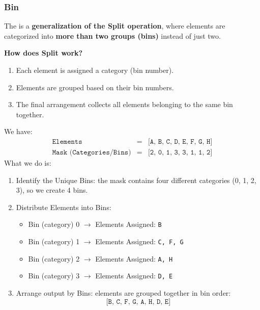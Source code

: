 \subsubsection{Bin}\label{subsubsection: Bin}

The  is a \textbf{generalization of the Split operation}, where elements are categorized into \textbf{more than two groups (bins)} instead of just two.

\highspace
\begin{flushleft}
    \textcolor{Green3}{ \textbf{How does Split work?}}
\end{flushleft}
\begin{enumerate}
    \item Each element is assigned a category (bin number).
    \item Elements are grouped based on their bin numbers.
    \item The final arrangement collects all elements belonging to the same bin together.
\end{enumerate}

\begin{examplebox}
    We have:
    \begin{equation*}
        \begin{array}{rcl}
            \texttt{Elements} &=& \texttt{[A, B, C, D, E, F, G, H]} \\ [.5em]
            \texttt{Mask (Categories/Bins)} &=& \texttt{[2, 0, 1, 3, 3, 1, 1, 2]}
        \end{array}
    \end{equation*}
    What we do is:
    \begin{enumerate}
        \item Identify the Unique Bins: the mask contains four different categories (0, 1, 2, 3), so we create 4 bins.
        \item Distribute Elements into Bins:
        \begin{itemize}
            \item Bin (category) 0 $\rightarrow$ Elements Assigned: \texttt{B}
            \item Bin (category) 1 $\rightarrow$ Elements Assigned: \texttt{C, F, G}
            \item Bin (category) 2 $\rightarrow$ Elements Assigned: \texttt{A, H}
            \item Bin (category) 3 $\rightarrow$ Elements Assigned: \texttt{D, E}
        \end{itemize}
        \item Arrange output by Bins: elements are grouped together in bin order:
        \begin{equation*}
            \texttt{[B, C, F, G, A, H, D, E]}
        \end{equation*}
    \end{enumerate}
\end{examplebox}

